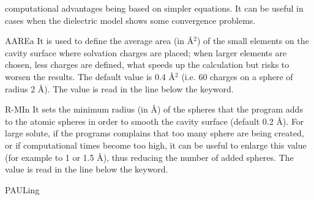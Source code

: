 \begin{keywordlist}
computational advantages being based on simpler equations. It can be useful in cases
when the dielectric model shows some convergence problems.
\item[AAREa]
It is used to define the average area (in \AA$^2$)
of the small elements on the cavity surface
where solvation charges are placed; when larger elements are chosen, less charges
are defined, what speeds up the calculation but risks to worsen the results. The
default value is 0.4 \AA$^2$ (i.e. 60 charges on a sphere of radius 2 \AA).
The value is read in the line below the keyword.
\item[R-MIn]
It sets the minimum radius (in \AA) of the spheres that the program adds to the atomic
spheres in order to smooth the cavity surface (default 0.2 \AA).
For large solute, if the programs
complains that too many sphere are being created, or if computational times
become too high, it can be useful to enlarge this value (for example to 1 or 1.5
\AA), thus reducing the number of added spheres.
The value is read in the line below the keyword.
\item[PAULing]

\end{keywordlist}
